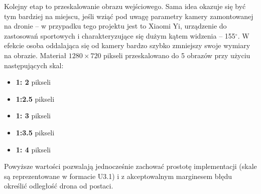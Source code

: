 Kolejny etap to przeskalowanie obrazu wejściowego. 
Sama idea okazuje się być tym bardziej na miejscu, jeśli wziąć pod uwagę parametry kamery zamontowanej na dronie -- w przypadku tego projektu jest to Xiaomi Yi, urządzenie do zastosowań sportowych i charakteryzujące się dużym kątem widzenia -- 155$^{\circ}$. %
W efekcie osoba oddalająca się od kamery bardzo szybko zmniejszy swoje wymiary na obrazie. 
Materiał $1280\times 720$ pikseli przeskalowano do 5 obrazów przy użyciu następujących skal:
\begin{itemize}
	\item \textbf{1:  2}\tab{:} pikseli
	\item \textbf{1:2.5}\tab{:} pikseli	
	\item \textbf{1:  3}\tab{:} pikseli
	\item \textbf{1:3.5}\tab{:} pikseli
	\item \textbf{1:  4}\tab{:} pikseli
\end{itemize}

Powyższe wartości pozwalają jednocześnie zachować prostotę implementacji (skale są reprezentowane w formacie U3.1) i z akceptowalnym marginesem błędu określić odległość drona od postaci. %


